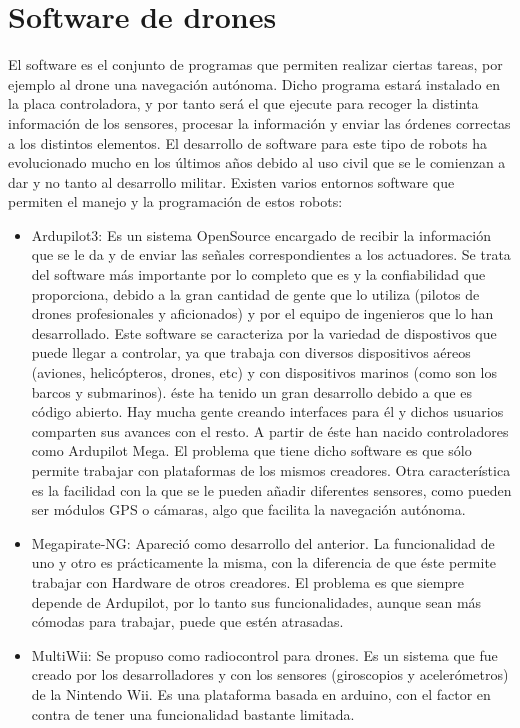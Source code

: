 \section{Software de drones}

El software es el conjunto de programas que permiten realizar ciertas tareas, por
ejemplo al drone una navegación autónoma. Dicho programa estará instalado en la
placa controladora, y por tanto será el que ejecute para recoger la distinta información
de los sensores, procesar la información y enviar las órdenes correctas a los distintos
elementos. El desarrollo de software para este tipo de robots ha evolucionado mucho
en los últimos años debido al uso civil que se le comienzan a dar y no tanto al desarrollo
militar. Existen varios entornos software que permiten el manejo y la programación de
estos robots:
\begin{itemize}
\item Ardupilot3: Es un sistema OpenSource encargado de recibir la información
que se le da y de enviar las señales correspondientes a los actuadores. Se
trata del software más importante por lo completo que es y la confiabilidad que
proporciona, debido a la gran cantidad de gente que lo utiliza (pilotos de drones
profesionales y aficionados) y por el equipo de ingenieros que lo han desarrollado.
Este software se caracteriza por la variedad de dispostivos que puede llegar a
controlar, ya que trabaja con diversos dispositivos aéreos (aviones, helicópteros,
drones, etc) y con dispositivos marinos (como son los barcos y submarinos). éste
ha tenido un gran desarrollo debido a que es código abierto. Hay mucha gente
creando interfaces para él y dichos usuarios comparten sus avances con el resto.
A partir de éste han nacido controladores como Ardupilot Mega. El problema
que tiene dicho software es que sólo permite trabajar con plataformas de los
mismos creadores. Otra característica es la facilidad con la que se le pueden
añadir diferentes sensores, como pueden ser módulos GPS o cámaras, algo que
facilita la navegación autónoma.
\item Megapirate-NG: Apareció como desarrollo del anterior. La funcionalidad de
uno y otro es prácticamente la misma, con la diferencia de que éste permite
trabajar con Hardware de otros creadores. El problema es que siempre depende
de Ardupilot, por lo tanto sus funcionalidades, aunque sean más cómodas para
trabajar, puede que estén atrasadas.
\item MultiWii: Se propuso como radiocontrol para drones. Es un sistema que fue
creado por los desarrolladores y con los sensores (giroscopios y acelerómetros) de
la Nintendo Wii. Es una plataforma basada en arduino, con el factor en contra
de tener una funcionalidad bastante limitada.

\end{itemize}

